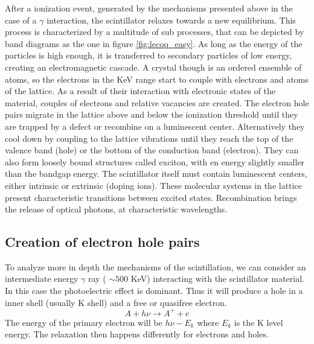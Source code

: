 After a ionization event, generated by the mechanisms presented above in the case of a $\gamma$ interaction, the scintillator relaxes towards a new equilibrium. This process is characterized by a multitude of sub processes, that can be depicted by band diagrams as the one in figure \ref{fig:lecoq_easy}.
As long as the energy of the particles is high enough, it is transferred to secondary particles of low energy, creating an electromagnetic cascade.
A crystal though is an ordered ensemble of atoms, so the electrons in the KeV range start to couple with electrons and atoms of the lattice. As a result of their interaction with electronic states of the material, couples of electrons and relative vacancies are created. The electron hole pairs migrate in the lattice above and below the ionization threshold until they are trapped by a defect or recombine on a luminescent center. Alternatively they cool down by coupling to the lattice vibrations until they reach the top of the valence band (hole) or the bottom of the conduction band (electron). They can also form loosely bound structures called exciton, with en energy slightly smaller than the bandgap energy.
The scintillator itself must contain luminescent centers, either intrinsic or extrinsic (doping ions). These molecular systems in the lattice present characteristic transitions between excited states.
Recombination brings the release of optical photons, at characteristic wavelengths.
%
%

\subsection{Creation of electron hole pairs}

To analyze more in depth the mechanisms of the scintillation, we can consider an intermediate energy $\gamma$ ray ( $\sim 500$ KeV) interacting with the scintillator material. In this case the photoelectric effect is dominant. Thus it will produce a hole in a inner shell (usually K shell) and a free or quasifree electron.
\begin{equation}
A + h\nu \rightarrow A^{+} + e
\end{equation}
The energy of the primary electron will be $h\nu - E_{k}$ where $E_{k}$ is the K level energy. The relaxation then happens differently for electrons and holes. 

